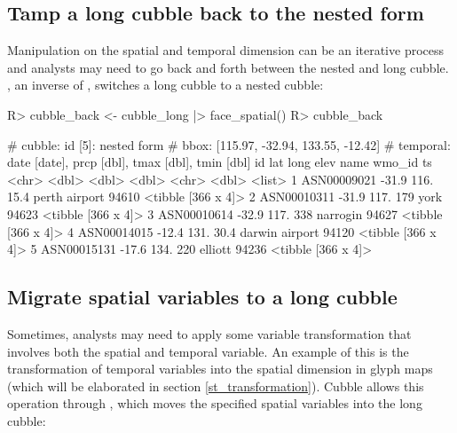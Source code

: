 \documentclass[
]{jss}
\begin{document}
\hypertarget{tamp-a-long-cubble-back-to-the-nested-form}{%
\subsection{Tamp a long cubble back to the nested form}\label{tamp-a-long-cubble-back-to-the-nested-form}}

Manipulation on the spatial and temporal dimension can be an iterative process and analysts may need to go back and forth between the nested and long cubble. , an inverse of , switches a long cubble to a nested cubble:

\begin{CodeChunk}
\begin{CodeInput}
R> cubble_back <- cubble_long |> face_spatial()
R> cubble_back
\end{CodeInput}
\begin{CodeOutput}
# cubble:   id [5]: nested form
# bbox:     [115.97, -32.94, 133.55, -12.42]
# temporal: date [date], prcp [dbl], tmax [dbl], tmin [dbl]
  id            lat  long  elev name           wmo_id ts                
  <chr>       <dbl> <dbl> <dbl> <chr>           <dbl> <list>            
1 ASN00009021 -31.9  116.  15.4 perth airport   94610 <tibble [366 x 4]>
2 ASN00010311 -31.9  117. 179   york            94623 <tibble [366 x 4]>
3 ASN00010614 -32.9  117. 338   narrogin        94627 <tibble [366 x 4]>
4 ASN00014015 -12.4  131.  30.4 darwin airport  94120 <tibble [366 x 4]>
5 ASN00015131 -17.6  134. 220   elliott         94236 <tibble [366 x 4]>
\end{CodeOutput}
\end{CodeChunk}

\hypertarget{migrate-spatial-variables-to-a-long-cubble}{%
\subsection{Migrate spatial variables to a long cubble}\label{migrate-spatial-variables-to-a-long-cubble}}

Sometimes, analysts may need to apply some variable transformation that involves both the spatial and temporal variable. An example of this is the transformation of temporal variables into the spatial dimension in glyph maps (which will be elaborated in section \ref{st_transformation}). Cubble allows this operation through , which moves the specified spatial variables into the long cubble:
\end{document}
